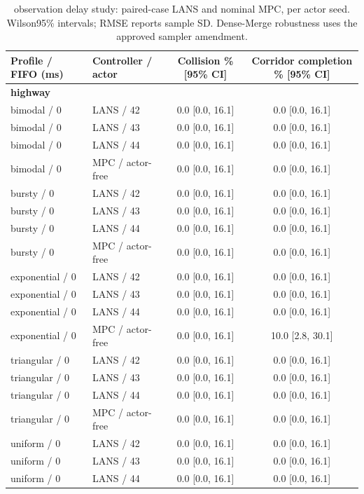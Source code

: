 \begin{longtable}{llcc}
\caption{observation delay study: paired-case LANS and nominal MPC, per actor seed. Wilson95\% intervals; RMSE reports sample SD. Dense-Merge robustness uses the approved sampler amendment.}\\
\toprule
Profile / FIFO (ms) & Controller / actor & Collision \% [95\% CI] & Corridor completion \% [95\% CI] \\
\midrule
\multicolumn{4}{l}{\textbf{highway}} \\
bimodal / 0 & LANS / 42 & 0.0 [0.0, 16.1] & 0.0 [0.0, 16.1] \\
bimodal / 0 & LANS / 43 & 0.0 [0.0, 16.1] & 0.0 [0.0, 16.1] \\
bimodal / 0 & LANS / 44 & 0.0 [0.0, 16.1] & 0.0 [0.0, 16.1] \\
bimodal / 0 & MPC / actor-free & 0.0 [0.0, 16.1] & 0.0 [0.0, 16.1] \\
bursty / 0 & LANS / 42 & 0.0 [0.0, 16.1] & 0.0 [0.0, 16.1] \\
bursty / 0 & LANS / 43 & 0.0 [0.0, 16.1] & 0.0 [0.0, 16.1] \\
bursty / 0 & LANS / 44 & 0.0 [0.0, 16.1] & 0.0 [0.0, 16.1] \\
bursty / 0 & MPC / actor-free & 0.0 [0.0, 16.1] & 0.0 [0.0, 16.1] \\
exponential / 0 & LANS / 42 & 0.0 [0.0, 16.1] & 0.0 [0.0, 16.1] \\
exponential / 0 & LANS / 43 & 0.0 [0.0, 16.1] & 0.0 [0.0, 16.1] \\
exponential / 0 & LANS / 44 & 0.0 [0.0, 16.1] & 0.0 [0.0, 16.1] \\
exponential / 0 & MPC / actor-free & 0.0 [0.0, 16.1] & 10.0 [2.8, 30.1] \\
triangular / 0 & LANS / 42 & 0.0 [0.0, 16.1] & 0.0 [0.0, 16.1] \\
triangular / 0 & LANS / 43 & 0.0 [0.0, 16.1] & 0.0 [0.0, 16.1] \\
triangular / 0 & LANS / 44 & 0.0 [0.0, 16.1] & 0.0 [0.0, 16.1] \\
triangular / 0 & MPC / actor-free & 0.0 [0.0, 16.1] & 0.0 [0.0, 16.1] \\
uniform / 0 & LANS / 42 & 0.0 [0.0, 16.1] & 0.0 [0.0, 16.1] \\
uniform / 0 & LANS / 43 & 0.0 [0.0, 16.1] & 0.0 [0.0, 16.1] \\
uniform / 0 & LANS / 44 & 0.0 [0.0, 16.1] & 0.0 [0.0, 16.1] \\

\end{longtable}
